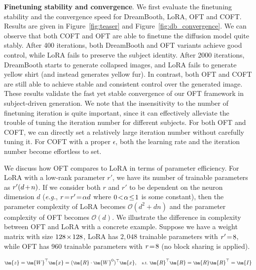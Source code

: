 \textbf{Finetuning stability and convergence}. We first evaluate the finetuning stability and the convergence speed for DreamBooth, LoRA, OFT and COFT. Results are given in Figure~\ref{fig:teaser} and Figure~\ref{fig:db_convergence}. We can observe that both COFT and OFT are able to finetune the diffusion model quite stably. After 400 iterations, both DreamBooth and OFT variants achieve good control, while LoRA fails to preserve the subject identity. After 2000 iterations, DreamBooth starts to generate collapsed images, and LoRA fails to generate yellow shirt (and instead generates yellow fur). In contrast, both OFT and COFT are still able to achieve stable and consistent control over the generated image. These results validate the fast yet stable convergence of our OFT framework in subject-driven generation. We note that the insensitivity to the number of finetuning iteration is quite important, since it can effectively alleviate the trouble of tuning the iteration number for different subjects. For both OFT and COFT, we can directly set a relatively large iteration number without carefully tuning it. For COFT with a proper $\epsilon$, both the learning rate and the iteration number become effortless to set.

We discuss how OFT compares to LoRA in terms of parameter efficiency. For LoRA with a low-rank parameter $r'$, we have its number of trainable parameters as $\thickmuskip=2mu \medmuskip=2mu r'(d+n)$. If we consider both $r$ and $r'$ to be dependent on the neuron dimension $d$ (\emph{e.g.}, $\thickmuskip=2mu \medmuskip=2mu r=r'=\alpha d$ where $\thickmuskip=2mu \medmuskip=2mu 0<\alpha\leq 1$ is some constant), then the parameter complexity of LoRA becomes $\mathcal{O}(d^2+dn)$ and the parameter complexity of OFT becomes $\mathcal{O}(d)$. We illustrate the difference in complexity between OFT and LoRA with a concrete example. Suppose we have a weight matrix with size $\thickmuskip=2mu \medmuskip=2mu 128\times 128$, LoRA has $2,048$ trainable parameters with $\thickmuskip=2mu \medmuskip=2mu r'=8$, while OFT has $960$ trainable parameters with $\thickmuskip=2mu \medmuskip=2mu r=8$ (no block sharing is applied).

\begin{equation}\label{eq:oft_general}
    \footnotesize
    \bm{z}=\bm{W}^\top\bm{x}=(\bm{R}\cdot\bm{W}^0)^\top\bm{x},~~~\text{s.t.}~\bm{R}^\top\bm{R}=\bm{R}\bm{R}^\top=\bm{I}
\end{equation}

